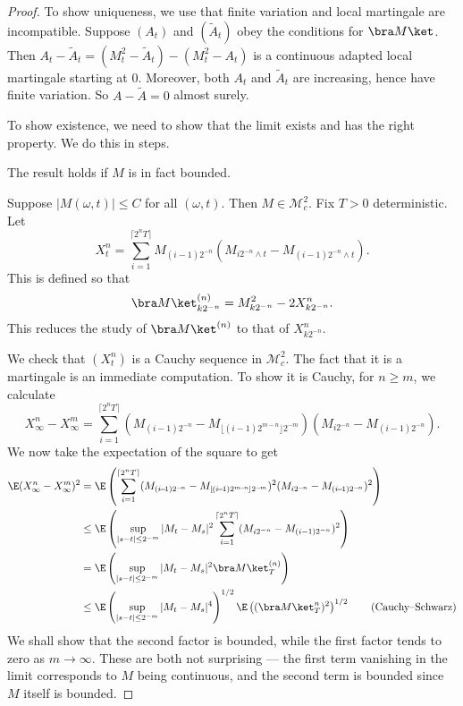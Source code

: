 \documentclass[a4paper]{article}
\begin{document}
\begin{proof}
  To show uniqueness, we use that finite variation and local martingale are incompatible. Suppose $(A_t)$ and $(\tilde{A}_t)$ obey the conditions for $\bra M\ket$. Then $A_t - \tilde{A}_t = (M_t^2 - \tilde{A}_t) - (M_t^2 - A_t)$ is a continuous adapted local martingale starting at $0$. Moreover, both $A_t$ and $\tilde{A}_t$ are increasing, hence have finite variation. So $A - \tilde{A} = 0$ almost surely.

  To show existence, we need to show that the limit exists and has the right property. We do this in steps.
  \begin{claim}
    The result holds if $M$ is in fact bounded.
  \end{claim}
  Suppose $|M(\omega, t)| \leq C$ for all $(\omega, t)$. Then $M \in \mathcal{M}_c^2$. Fix $T > 0$ deterministic. Let
  \[
    X_t^n = \sum_{i = 1}^{\lceil 2^n T \rceil} M_{(i - 1)2^{-n}} (M_{i 2^{-n} \wedge t} - M_{(i - 1) 2^{-n} \wedge t}).
  \]
  This is defined so that
  \[
    \bra M \ket_{k2^{-n}}^{(n)} = M_{k2^{-n}}^2 - 2 X_{k 2^{-n}}^n.
  \]
  This reduces the study of $\bra M\ket^{(n)}$ to that of $X_{k2^{-n}}^n$.

  We check that $(X_t^n)$ is a Cauchy sequence in $\mathcal{M}_c^2$. The fact that it is a martingale is an immediate computation. To show it is Cauchy, for $n \geq m$, we calculate
  \[
    X_\infty^n - X_\infty^m = \sum_{i = 1}^{\lceil 2^n T\rceil} (M_{(i - 1)2^{-n}} - M_{\lfloor (i - 1) 2^{m - n}\rfloor 2^{-m}})(M_{i2^{-n}} - M_{(i - 1)2^{-n}}).
  \]
  We now take the expectation of the square to get
  \begin{align*}
    \E (X_\infty^n - X_\infty^m)^2 &= \E\left(\sum_{i = 1}^{\lceil 2^n T\rceil} (M_{(i\!-\!1)2^{-\!n}} - M_{\lfloor\!(i\!-\!1) 2^{m\!-\!n}\!\rfloor 2^{-\!m}})^2(M_{i 2^{-\!n}} - M_{(i\!-\!1)2^{-\!n}})^2\right)\\
    &\leq \E \left(\sup_{|s - t| \leq 2^{-m}} |M_t - M_s|^2 \sum_{i = 1}^{\lceil 2^n T\rceil} (M_{i2^{-n}} - M_{(i - 1)2^{-n}})^2\right)\\
    &= \E \left(\sup_{|s - t| \leq 2^{-m}} |M_t - M_s|^2 \bra M\ket_T^{(n)}\right)\\
    &\leq \E \left(\sup_{|s - t| \leq 2^{-m}}|M_t - M_s|^4\right)^{1/2}\E \left((\bra M\ket_T^n)^2\right)^{1/2}\tag{Cauchy--Schwarz}
  \end{align*}
  We shall show that the second factor is bounded, while the first factor tends to zero as $m \to \infty$. These are both not surprising --- the first term vanishing in the limit corresponds to $M$ being continuous, and the second term is bounded since $M$ itself is bounded.


\end{proof}
\end{document}
